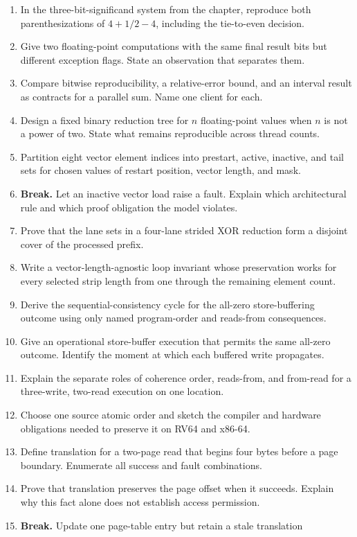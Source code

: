 \begin{enumerate}
no longer be transported.
\item In the three-bit-significand system from the chapter, reproduce both
parenthesizations of \(4+1/2-4\), including the tie-to-even decision.
\item Give two floating-point computations with the same final result bits but
different exception flags. State an observation that separates them.
\item Compare bitwise reproducibility, a relative-error bound, and an interval
result as contracts for a parallel sum. Name one client for each.
\item Design a fixed binary reduction tree for \(n\) floating-point values
when \(n\) is not a power of two. State what remains reproducible across thread
counts.
\item Partition eight vector element indices into prestart, active, inactive,
and tail sets for chosen values of restart position, vector length, and mask.
\item \textbf{Break.} Let an inactive vector load raise a fault. Explain which
architectural rule and which proof obligation the model violates.
\item Prove that the lane sets in a four-lane strided XOR reduction form a
disjoint cover of the processed prefix.
\item Write a vector-length-agnostic loop invariant whose preservation works
for every selected strip length from one through the remaining element count.
\item Derive the sequential-consistency cycle for the all-zero store-buffering
outcome using only named program-order and reads-from consequences.
\item Give an operational store-buffer execution that permits the same
all-zero outcome. Identify the moment at which each buffered write propagates.
\item Explain the separate roles of coherence order, reads-from, and from-read
for a three-write, two-read execution on one location.
\item Choose one source atomic order and sketch the compiler and hardware
obligations needed to preserve it on RV64 and x86-64.
\item Define translation for a two-page read that begins four bytes before a
page boundary. Enumerate all success and fault combinations.
\item Prove that translation preserves the page offset when it succeeds.
Explain why this fact alone does not establish access permission.
\item \textbf{Break.} Update one page-table entry but retain a stale translation

\end{enumerate}
